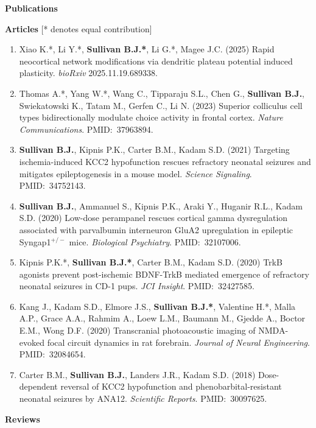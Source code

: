 \documentclass{resume} %
\begin{document}
\begin{rSection}{{\bfseries Publications}}

    {\bfseries Articles} [* denotes equal contribution]

    \begin{enumerate}[resume, leftmargin=2em, itemsep=2pt, parsep=0pt, topsep=2pt, partopsep=0pt]
        \item Xiao K.*, Li Y.*, {\bfseries Sullivan B.J.*},  Li G.*, Magee J.C. (2025) Rapid neocortical network modifications via dendritic plateau potential induced plasticity. \emph{bioRxiv} 2025.11.19.689338.
        \item Thomas A.*, Yang W.*, Wang C., Tipparaju S.L., Chen G., {\bfseries Sullivan B.J.}, Swiekatowski K., Tatam M., Gerfen C., Li N. (2023) Superior colliculus cell types bidirectionally modulate choice activity in frontal cortex. \emph{Nature Communications}. PMID:~37963894.
        \item {\bfseries Sullivan B.J.}, Kipnis P.K., Carter B.M., Kadam S.D. (2021) Targeting ischemia-induced KCC2 hypofunction rescues refractory neonatal seizures and mitigates epileptogenesis in a mouse model. \emph{Science Signaling}. PMID:~34752143.
        \item {\bfseries Sullivan B.J.}, Ammanuel S., Kipnis P.K., Araki Y., Huganir R.L., Kadam S.D. (2020) Low-dose perampanel rescues cortical gamma dysregulation associated with parvalbumin interneuron GluA2 upregulation in epileptic Syngap1$^{+/-}$ mice. \emph{Biological Psychiatry}. PMID:~32107006.
        \item Kipnis P.K.*, {\bfseries Sullivan B.J.*}, Carter B.M., Kadam S.D. (2020) TrkB agonists prevent post-ischemic BDNF-TrkB mediated emergence of refractory neonatal seizures in CD-1 pups. \emph{JCI Insight}. PMID:~32427585.
        \item Kang J., Kadam S.D., Elmore J.S., {\bfseries Sullivan B.J.*}, Valentine H.*, Malla A.P., Grace A.A., Rahmim A., Loew L.M., Baumann M., Gjedde A., Boctor E.M., Wong D.F. (2020) Transcranial photoacoustic imaging of NMDA-evoked focal circuit dynamics in rat forebrain. \emph{Journal of Neural Engineering}. PMID:~32084654.
        \item Carter B.M., {\bfseries Sullivan B.J.}, Landers J.R., Kadam S.D. (2018) Dose-dependent reversal of KCC2 hypofunction and phenobarbital-resistant neonatal seizures by ANA12. \emph{Scientific Reports}. PMID:~30097625.
    \end{enumerate}
    {\bfseries Reviews}


\end{rSection}
\end{document}
